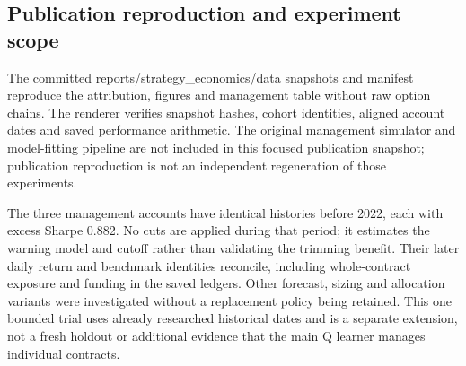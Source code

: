\documentclass[11pt,letterpaper]{article}
\begin{document}
\subsection*{Publication reproduction and experiment scope}
The committed reports/strategy\_economics/data snapshots and manifest reproduce the attribution, figures and management table without raw option chains. The renderer verifies snapshot hashes, cohort identities, aligned account dates and saved performance arithmetic. The original management simulator and model-fitting pipeline are not included in this focused publication snapshot; publication reproduction is not an independent regeneration of those experiments.

The three management accounts have identical histories before 2022, each with excess Sharpe 0.882. No cuts are applied during that period; it estimates the warning model and cutoff rather than validating the trimming benefit. Their later daily return and benchmark identities reconcile, including whole-contract exposure and funding in the saved ledgers. Other forecast, sizing and allocation variants were investigated without a replacement policy being retained. This one bounded trial uses already researched historical dates and is a separate extension, not a fresh holdout or additional evidence that the main Q learner manages individual contracts.
\end{document}
